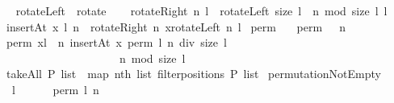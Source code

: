 \begin{isabellebody}
{\isafoldproof}%
%
\isadelimproof
%
\endisadelimproof
%
\isamarkuptrue%
\isamarkupfalse%
\ \isanewline
\ \ {\isachardoublequoteopen}rotateLeft\ {\isacharequal}{\isacharequal}\ rotate{\isachardoublequoteclose}\isanewline
{}\isamarkupfalse%
\ \isanewline
\ \ {\isachardoublequoteopen}rotateRight\ n\ l\ {\isacharequal}{\isacharequal}\ rotateLeft\ {\isacharparenleft}size\ l\ {\isacharminus}\ {\isacharparenleft}n\ mod\ {\isacharparenleft}size\ l{\isacharparenright}{\isacharparenright}{\isacharparenright}\ l{\isachardoublequoteclose}\isanewline
\isanewline
\isanewline
\isanewline
{}\isamarkupfalse%
\ \isanewline
\ \ {\isachardoublequoteopen}insertAt\ x\ l\ n\ {\isacharequal}{\isacharequal}\ rotateRight\ n\ {\isacharparenleft}x{\isacharhash}{\isacharparenleft}rotateLeft\ n\ l{\isacharparenright}{\isacharparenright}{\isachardoublequoteclose}\isanewline
\isanewline
\isanewline
{}\isamarkupfalse%
\ perm{}\ \isanewline
\ \ {\isachardoublequoteopen}perm{}\ {\isacharbrackleft}{\isacharbrackright}\ {\isacharequal}\ {\isacharparenleft}{\isacharpercent}n{\isachardot}\ {\isacharbrackleft}{\isacharbrackright}{\isacharparenright}{\isachardoublequoteclose}\ {\isacharbar}\ \isanewline
\ \ {\isachardoublequoteopen}perm{}\ {\isacharparenleft}x{\isacharhash}l{\isacharparenright}\ {\isacharequal}\ {\isacharparenleft}{\isacharpercent}n{\isachardot}\ insertAt\ x\ {\isacharparenleft}{\isacharparenleft}perm{}\ l{\isacharparenright}\ {\isacharparenleft}n\ div\ {\isacharparenleft}{}{\isacharplus}size\ l{\isacharparenright}{\isacharparenright}{\isacharparenright}\isanewline
\ \ \ \ \ \ \ \ \ \ \ \ \ \ \ \ \ \ \ \ \ \ {\isacharparenleft}n\ mod\ {\isacharparenleft}{}{\isacharplus}size\ l{\isacharparenright}{\isacharparenright}{\isacharparenright}{\isachardoublequoteclose}\isanewline
\isanewline
{}\isamarkupfalse%
\ \isanewline
\ \ {\isachardoublequoteopen}takeAll\ P\ list\ {\isacharequal}{\isacharequal}\ map\ {\isacharparenleft}nth\ list{\isacharparenright}\ {\isacharparenleft}filterpositions{}\ P\ list{\isacharparenright}{\isachardoublequoteclose}\isanewline
\isanewline
{}\isamarkupfalse%
\ permutationNotEmpty{\isacharcolon}\ \isanewline
\ \ \ {\isachardoublequoteopen}l\ {\isasymnoteq}\ {\isacharbrackleft}{\isacharbrackright}{\isachardoublequoteclose}\ \isanewline
\ \ \ {\isachardoublequoteopen}perm{}\ l\ n\ {\isasymnoteq}\ {\isacharbrackleft}{\isacharbrackright}{\isachardoublequoteclose}\ \isanewline

\end{isabellebody}
